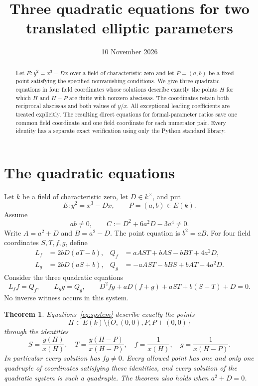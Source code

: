 \documentclass[11pt,a4paper]{article}
\title{Three quadratic equations for two translated elliptic parameters}
\author{}\date{10 November 2026}
\newtheorem{theorem}{Theorem}[section]
\begin{document}
\maketitle
\begin{abstract}
Let $E:y^2=x^3-Dx$ over a field of characteristic zero and let
$P=(a,b)$ be a fixed point satisfying the specified nonvanishing
conditions. We give three quadratic equations in four field coordinates
whose solutions describe exactly the points $H$ for which $H$ and
$H-P$ are finite with nonzero abscissas. The coordinates retain both
reciprocal abscissas and both values of $y/x$. All exceptional leading
coefficients are treated explicitly. The resulting direct equations
for formal-parameter ratios save one common field coordinate and one
field coordinate for each numerator pair. Every identity has a separate
exact verification using only the Python standard library.
\end{abstract}

\section{The quadratic equations}
Let $k$ be a field of characteristic zero, let $D\in k^\times$, and put
\[
 E:y^2=x^3-Dx,\qquad P=(a,b)\in E(k).
\]
Assume
\begin{equation}\label{eq:assumptions}
 ab\ne0,\qquad C:=D^2+6a^2D-3a^4\ne0.
\end{equation}
Write $A=a^2+D$ and $B=a^2-D$. The point equation is $b^2=aB$.
For four field coordinates $S,T,f,g$, define
\begin{align*}
 L_f&=2bD(aT-b),& Q_f&=aAST+bAS-bBT+4a^2D,\\
 L_g&=2bD(aS+b),& Q_g&=-aAST-bBS+bAT-4a^2D.
\end{align*}
Consider the three quadratic equations
\begin{equation}\label{eq:system}
 L_ff=Q_f,\qquad L_gg=Q_g,\qquad
 D^2fg+aD(f+g)+aST+b(S-T)+D=0.
\end{equation}
No inverse witness occurs in this system.

\begin{theorem}\label{thm:chart}
Equations~\eqref{eq:system} describe exactly the points
\[
 H\in E(k)\setminus\{O,(0,0),P,P+(0,0)\}
\]
through the identities
\begin{equation}\label{eq:interpretation}
 S=\frac{y(H)}{x(H)},\quad T=\frac{y(H-P)}{x(H-P)},\quad
 f=\frac1{x(H)},\quad g=\frac1{x(H-P)}.
\end{equation}
In particular every solution has $fg\ne0$. Every allowed point has
one and only one quadruple of coordinates satisfying these identities,
and every solution of the quadratic system is such a quadruple.
The theorem also holds when $a^2+D=0$.
\end{theorem}
\end{document}
